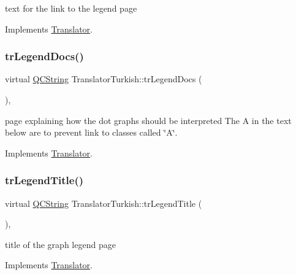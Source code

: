 text for the link to the legend page 

Implements \mbox{\hyperlink{class_translator}{Translator}}.

\mbox{\label{class_translator_turkish_ac8ca77a3cd21766654d2f1472910433a}} 
\subsubsection{\texorpdfstring{trLegendDocs()}{trLegendDocs()}}
{\footnotesize\ttfamily virtual \mbox{\hyperlink{class_q_c_string}{Q\+C\+String}} Translator\+Turkish\+::tr\+Legend\+Docs (\begin{DoxyParamCaption}{ }\end{DoxyParamCaption})\hspace{0.3cm}{\ttfamily [inline]}, {\ttfamily [virtual]}}

page explaining how the dot graph\textquotesingle{}s should be interpreted The A in the text below are to prevent link to classes called \char`\"{}\+A\char`\"{}. 

Implements \mbox{\hyperlink{class_translator}{Translator}}.

\mbox{\label{class_translator_turkish_a8a5bfd92f0bc1bc243070888bb8cd0d0}} 
\subsubsection{\texorpdfstring{trLegendTitle()}{trLegendTitle()}}
{\footnotesize\ttfamily virtual \mbox{\hyperlink{class_q_c_string}{Q\+C\+String}} Translator\+Turkish\+::tr\+Legend\+Title (\begin{DoxyParamCaption}{ }\end{DoxyParamCaption})\hspace{0.3cm}{\ttfamily [inline]}, {\ttfamily [virtual]}}

title of the graph legend page 

Implements \mbox{\hyperlink{class_translator}{Translator}}.

\mbox{\label{class_translator_turkish_a9030eaec8a7984895f68e7f91e8b9587}} 
